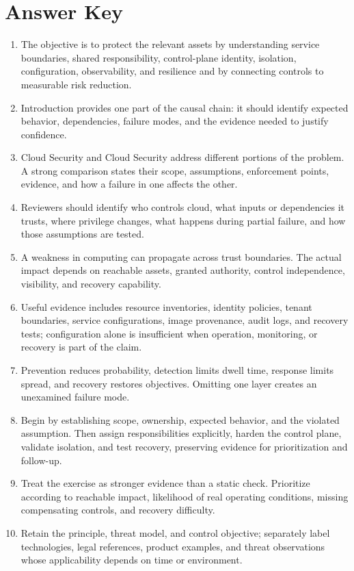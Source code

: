 \documentclass[11pt]{article}
\begin{document}
\section*{Answer Key}
\begin{enumerate}
\item The objective is to protect the relevant assets by understanding service boundaries, shared responsibility, control-plane identity, isolation, configuration, observability, and resilience and by connecting controls to measurable risk reduction.
\item Introduction provides one part of the causal chain: it should identify expected behavior, dependencies, failure modes, and the evidence needed to justify confidence.
\item Cloud Security and Cloud Security address different portions of the problem. A strong comparison states their scope, assumptions, enforcement points, evidence, and how a failure in one affects the other.
\item Reviewers should identify who controls cloud, what inputs or dependencies it trusts, where privilege changes, what happens during partial failure, and how those assumptions are tested.
\item A weakness in computing can propagate across trust boundaries. The actual impact depends on reachable assets, granted authority, control independence, visibility, and recovery capability.
\item Useful evidence includes resource inventories, identity policies, tenant boundaries, service configurations, image provenance, audit logs, and recovery tests; configuration alone is insufficient when operation, monitoring, or recovery is part of the claim.
\item Prevention reduces probability, detection limits dwell time, response limits spread, and recovery restores objectives. Omitting one layer creates an unexamined failure mode.
\item Begin by establishing scope, ownership, expected behavior, and the violated assumption. Then assign responsibilities explicitly, harden the control plane, validate isolation, and test recovery, preserving evidence for prioritization and follow-up.
\item Treat the exercise as stronger evidence than a static check. Prioritize according to reachable impact, likelihood of real operating conditions, missing compensating controls, and recovery difficulty.
\item Retain the principle, threat model, and control objective; separately label technologies, legal references, product examples, and threat observations whose applicability depends on time or environment.
\end{enumerate}
\end{document}
